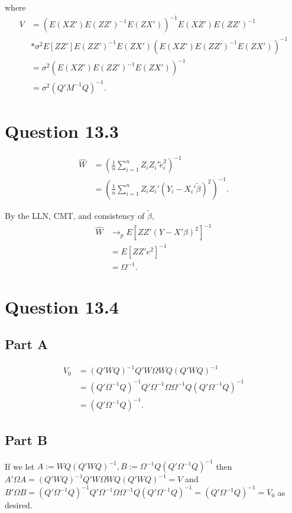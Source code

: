 \documentclass[11pt]{article} %
\begin{document}
where 
\begin{align*}
V &= \left( E\left( XZ'\right)E\left(ZZ'\right)^{-1}E\left(ZX'\right)\right)^{-1}E\left(XZ'\right)E\left(ZZ'\right)^{-1} \\&*\sigma^2E[ZZ']E\left(ZZ'\right)^{-1}E\left(ZX'\right)\left( E\left( XZ'\right)E\left(ZZ'\right)^{-1}E\left(ZX'\right)\right)^{-1}\\
&= \sigma^2 \left( E\left( XZ'\right)E\left(ZZ'\right)^{-1}E\left(ZX'\right)\right)^{-1} \\
&= \sigma^2(Q'M^{-1}Q)^{-1}.
\end{align*}

\section{Question 13.3}

\begin{align*}
\hat{W} &= \left(\frac{1}{n} \sum_{i=1}^n Z_i Z_i'\tilde{e}_i^2 \right)^{-1}\\
&= \left(\frac{1}{n} \sum_{i=1}^n Z_i Z_i'(Y_i - X_i'\tilde{\beta})^2 \right)^{-1}.
\end{align*}

By the LLN, CMT, and consistency of $\tilde{\beta},$
\begin{align*}
\hat{W} &\rightarrow_p E[ZZ'(Y-X'\beta)^2]^{-1}\\
&= E[ZZ'e^2]^{-1}\\
&= \Omega^{-1}.
\end{align*}
\section{Question 13.4}
\subsection{Part A}
\begin{align*}
V_0 &= (Q'WQ)^{-1}Q'W\Omega WQ(Q'WQ)^{-1}\\
&= (Q'\Omega^{-1}Q)^{-1}Q'\Omega^{-1}\Omega \Omega^{-1}Q(Q'\Omega^{-1}Q)^{-1}\\
&= (Q'\Omega^{-1}Q)^{-1}.
\end{align*}

\subsection{Part B}
If we let $A := WQ(Q'WQ)^{-1}, B:= \Omega^{-1}Q(Q'\Omega^{-1}Q)^{-1}$ then $A'\Omega A = (Q'WQ)^{-1}Q'W\Omega WQ(Q'WQ)^{-1} = V$ and $B'\Omega B  = (Q'\Omega^{-1}Q)^{-1}Q' \Omega^{-1}\Omega \Omega^{-1} Q (Q'\Omega^{-1}Q)^{-1} = (Q'\Omega^{-1}Q)^{-1} = V_0$ as desired.
\end{document}
